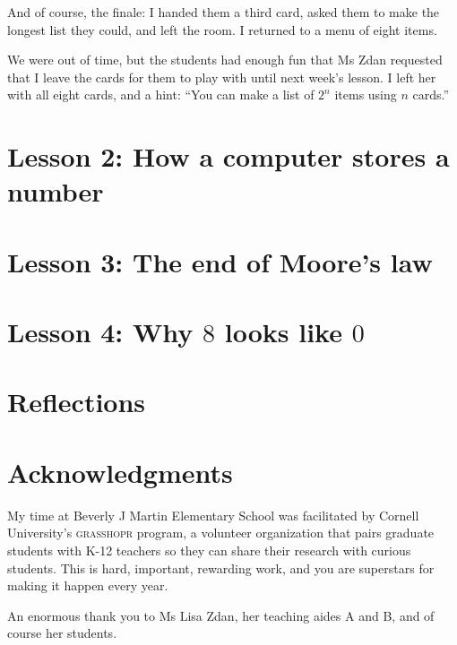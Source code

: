 \documentclass[sigplan,review]{acmart}
\begin{document}
And of course, the finale: I handed them a third card, asked them to make the longest list they could, and left the room.
I returned to a menu of eight items.

We were out of time, but the students had enough fun that Ms Zdan requested that I leave the cards for them to play with until next week's lesson.
I left her with all eight cards, and a hint: ``You can make a list of $2^n$ items using $n$ cards.''


\section*{Lesson 2: How a computer stores a number}

\section*{Lesson 3: The end of Moore's law}

\section*{Lesson 4: Why $8$ looks like $0$}

\section*{Reflections}



\section*{Acknowledgments}

My time at Beverly J Martin Elementary School was facilitated by Cornell University's \textsc{grasshopr} program, a volunteer organization that pairs graduate students with K-12 teachers so they can share their research with curious students.
This is hard, important, rewarding work, and you are superstars for making it happen every year.

An enormous thank you to Ms Lisa Zdan, her teaching aides A and B, and of course her students.

\appendix



\end{document}

